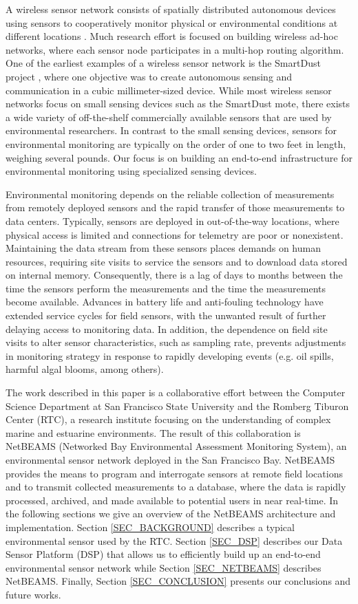 \documentclass[conference]{IEEEtran}
\begin{document}
A wireless sensor network consists of spatially distributed autonomous
devices using sensors to cooperatively monitor physical or
environmental conditions at different locations \cite{roemer:2004}.
Much research effort is focused on building wireless ad-hoc networks, 
where each sensor node participates in a multi-hop routing algorithm.
One of the earliest examples of a wireless sensor network is the
SmartDust project \cite{smartdust:2001}, where one objective was to
create autonomous sensing and communication in a cubic
millimeter-sized device.  While most wireless sensor networks focus on
small sensing devices such as the SmartDust mote, there exists a wide
variety of off-the-shelf commercially available sensors that are used
by environmental researchers. In contrast to the small sensing
devices, sensors for environmental monitoring are typically on the
order of one to two feet in length, weighing several pounds. Our
focus is on building an end-to-end infrastructure for environmental
monitoring using specialized sensing devices.

Environmental monitoring depends on the reliable collection of
measurements from remotely deployed sensors and the rapid transfer of
those measurements to data centers. Typically, sensors are deployed in
out-of-the-way locations, where physical access is limited and
connections for telemetry are poor or nonexistent. Maintaining the
data stream from these sensors places demands on human resources,
requiring site visits to service the sensors and to download data
stored on internal memory.  Consequently, there is a lag of days to
months between the time the sensors perform the measurements and the
time the measurements become available. Advances in battery life and
anti-fouling technology have extended service cycles for field
sensors, with the unwanted result of further delaying access to
monitoring data.  In addition, the dependence on field site visits to
alter sensor characteristics, such as sampling rate, prevents
adjustments in monitoring strategy in response to rapidly developing
events (e.g. oil spills, harmful algal blooms, among others).

The work described in this paper is a collaborative effort between the
Computer Science Department at San Francisco State University and the
Romberg Tiburon Center (RTC), a research institute focusing on the
understanding of complex marine and estuarine environments. The result
of this collaboration is NetBEAMS (Networked Bay Environmental
Assessment Monitoring System), an environmental sensor network
deployed in the San Francisco Bay. NetBEAMS provides the means to program
and interrogate sensors at remote field locations and to transmit
collected measurements to a database, where the data is rapidly
processed, archived, and made available to potential users in near
real-time. In the following sections we give an overview of the NetBEAMS
architecture and implementation.  Section \ref{SEC_BACKGROUND}
describes a typical environmental sensor used by the RTC. Section
\ref{SEC_DSP} describes our Data Sensor Platform (DSP) that allows us
to efficiently build up an end-to-end environmental sensor network while
Section \ref{SEC_NETBEAMS} describes NetBEAMS. Finally, Section 
\ref{SEC_CONCLUSION} presents our conclusions and future works.
\end{document}
